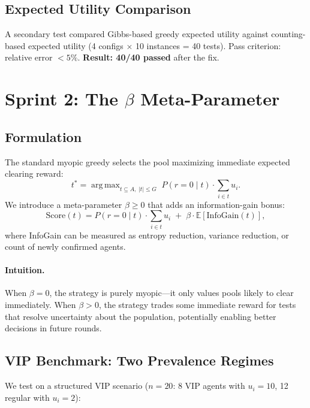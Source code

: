 \documentclass[11pt,a4paper]{article}
\newcommand{\E}{\mathbb{E}}
\DeclareMathOperator*{\argmax}{arg\,max}
\begin{document}
\subsection{Expected Utility Comparison}

A secondary test compared Gibbs-based greedy expected utility against counting-based expected utility (4 configs $\times$ 10 instances = 40 tests).
Pass criterion: relative error $< 5\%$.
\textbf{Result: 40/40 passed} after the fix.


\section{Sprint 2: The $\beta$ Meta-Parameter}
\label{sec:beta}

\subsection{Formulation}

The standard myopic greedy selects the pool maximizing immediate expected clearing reward:
\[
  t^* = \argmax_{t \subseteq A,\; |t| \leq G} \; P(r{=}0 \mid t) \cdot \sum_{i \in t} u_i.
\]
We introduce a meta-parameter $\beta \geq 0$ that adds an information-gain bonus:
\begin{equation}
\label{eq:beta_score}
  \text{Score}(t) = P(r{=}0 \mid t) \cdot \sum_{i \in t} u_i \;+\; \beta \cdot \E[\text{InfoGain}(t)],
\end{equation}
where InfoGain can be measured as entropy reduction, variance reduction, or count of newly confirmed agents.

\paragraph{Intuition.}
When $\beta = 0$, the strategy is purely myopic---it only values pools likely to clear immediately.
When $\beta > 0$, the strategy trades some immediate reward for tests that resolve uncertainty about the population, potentially enabling better decisions in future rounds.


\subsection{VIP Benchmark: Two Prevalence Regimes}

We test on a structured VIP scenario ($n=20$: 8 VIP agents with $u_i=10$, 12 regular with $u_i=2$):
\end{document}
